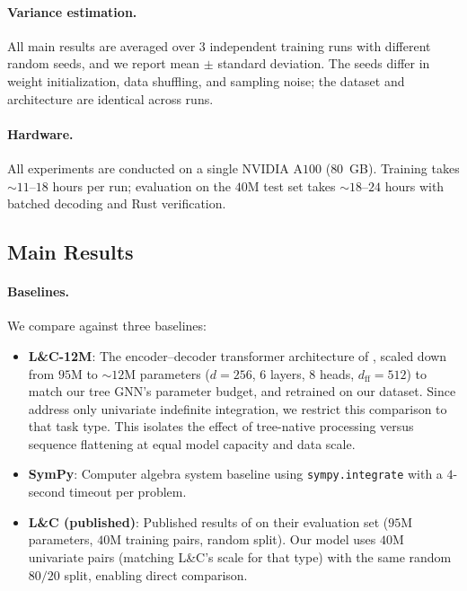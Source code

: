 \documentclass{article}
\begin{document}
\paragraph{Variance estimation.} All main results are averaged over $3$
independent training runs with different random seeds, and we report
mean $\pm$ standard deviation. The seeds differ in weight initialization,
data shuffling, and sampling noise; the dataset and architecture are
identical across runs.

\paragraph{Hardware.} All experiments are conducted on a single NVIDIA
A$100$ ($80$~GB). Training takes $\sim\!11$--$18$ hours per run;
evaluation on the $40$M test set takes $\sim\!18$--$24$ hours
with batched decoding and Rust verification.


\subsection{Main Results}

\paragraph{Baselines.}
We compare against three baselines:
\begin{itemize}
	\item \textbf{L\&C-12M}: The encoder--decoder transformer architecture
	      of \citet{lample2020deep}, scaled down from $95$M to $\sim\!12$M
	      parameters ($d\!=\!256$, $6$ layers, $8$ heads,
	      $d_{\text{ff}}\!=\!512$) to match our tree GNN's parameter
	      budget, and retrained on our dataset. Since
	      \citet{lample2020deep} address only univariate indefinite
	      integration, we restrict this comparison to that task type.
	      This isolates the effect of tree-native processing versus
	      sequence flattening at equal model capacity and data scale.
	\item \textbf{SymPy}: Computer algebra system baseline using
	      \texttt{sympy.integrate} with a $4$-second timeout per problem.
	\item \textbf{L\&C (published)}: Published results of
	      \citet{lample2020deep} on their evaluation set ($95$M parameters,
	      $40$M training pairs, random split). Our model uses $40$M
	      univariate pairs (matching L\&C's scale for that type) with the
	      same random $80/20$ split, enabling direct comparison.
\end{itemize}
\end{document}

